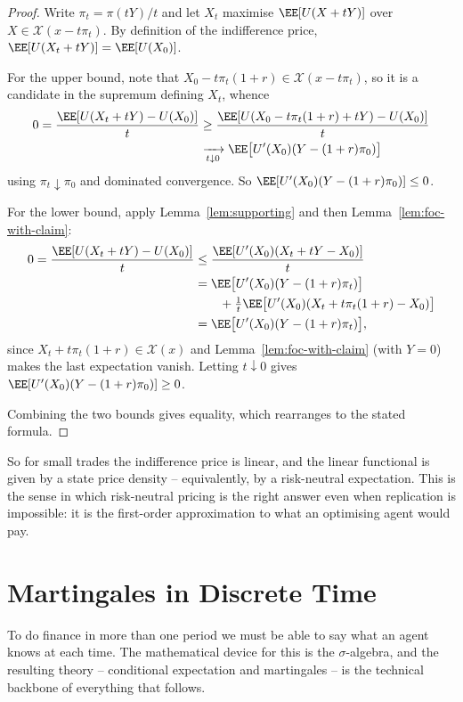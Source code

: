 \begin{proof}
	Write $\pi_t = \pi(tY)/t$ and let $X_t$ maximise $\EE[U(X + tY)]$ over $X \in \mathcal{X}(x - t\pi_t)$. By definition of the indifference price, $\EE[U(X_t + tY)] = \EE[U(X_0)]$.

	For the upper bound, note that $X_0 - t\pi_t(1+r) \in \mathcal{X}(x - t\pi_t)$, so it is a candidate in the supremum defining $X_t$, whence
	\begin{align*}
		0 = \frac{\EE[U(X_t+tY) - U(X_0)]}{t} &\geq \frac{\EE[U(X_0 - t\pi_t(1+r)+tY) - U(X_0)]}{t}\\
		&\xrightarrow[t\downarrow 0]{} \EE\big[U'(X_0)(Y - (1+r)\pi_0)\big]
	\end{align*}
	using $\pi_t \downarrow \pi_0$ and dominated convergence. So $\EE[U'(X_0)(Y - (1+r)\pi_0)] \leq 0$.

	For the lower bound, apply Lemma~\ref{lem:supporting} and then Lemma~\ref{lem:foc-with-claim}:
	\begin{align*}
		0 = \frac{\EE[U(X_t+tY)-U(X_0)]}{t} &\leq \frac{\EE[U'(X_0)(X_t + tY - X_0)]}{t}\\
		&= \EE\big[U'(X_0)(Y - (1+r)\pi_t)\big]\\
		&\qquad{}+ \tfrac{1}{t}\EE\big[U'(X_0)(X_t + t\pi_t(1+r) - X_0)\big]\\
		&= \EE\big[U'(X_0)(Y - (1+r)\pi_t)\big],
	\end{align*}
	since $X_t + t\pi_t(1+r) \in \mathcal{X}(x)$ and Lemma~\ref{lem:foc-with-claim} (with $Y=0$) makes the last expectation vanish. Letting $t \downarrow 0$ gives $\EE[U'(X_0)(Y-(1+r)\pi_0)] \geq 0$.

	Combining the two bounds gives equality, which rearranges to the stated formula.
\end{proof}

So for small trades the indifference price is linear, and the linear functional is given by a state price density -- equivalently, by a risk-neutral expectation. This is the sense in which risk-neutral pricing is the right answer even when replication is impossible: it is the first-order approximation to what an optimising agent would pay.

\section{Martingales in Discrete Time}

To do finance in more than one period we must be able to say what an agent knows at each time. The mathematical device for this is the $\sigma$-algebra, and the resulting theory -- conditional expectation and martingales -- is the technical backbone of everything that follows.

